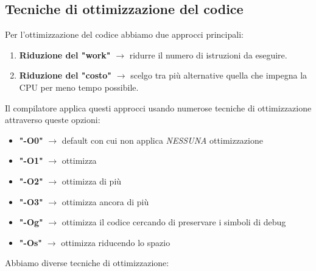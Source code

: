 \subsection{Tecniche di ottimizzazione del codice}
Per l'ottimizzazione del codice abbiamo due approcci principali:
\begin{enumerate}
    \item \textbf{Riduzione del "work"} $\rightarrow$ ridurre il numero di istruzioni da eseguire.
    \item \textbf{Riduzione del "costo"} $\rightarrow$ scelgo tra più alternative quella che impegna
    la CPU per meno tempo possibile.
\end{enumerate}
Il compilatore applica questi approcci usando numerose tecniche di ottimizzazione attraverso queste opzioni:
\begin{itemize}
    \item \textbf{"-O0"} $\rightarrow$ default con cui non applica \textit{NESSUNA} ottimizzazione 
    \item \textbf{"-O1"} $\rightarrow$ ottimizza
    \item \textbf{"-O2"} $\rightarrow$ ottimizza di più 
    \item \textbf{"-O3"} $\rightarrow$ ottimizza ancora di più
    \item \textbf{"-Og"} $\rightarrow$ ottimizza il codice cercando di preservare i simboli di debug
    \item \textbf{"-Os"} $\rightarrow$ ottimizza riducendo lo spazio
\end{itemize}
Abbiamo diverse tecniche di ottimizzazione:
